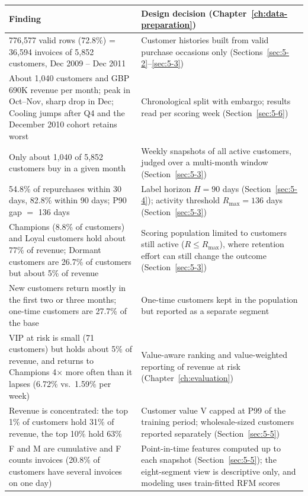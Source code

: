 \begin{center}
\small
\begin{tabular}{@{}p{7.2cm}p{7cm}@{}}
    \toprule
    Finding & Design decision (Chapter~\ref{ch:data-preparation}) \\
    \midrule
    776,577 valid rows (72.8\%) = 36,594 invoices of 5,852 customers, Dec 2009 -- Dec 2011 & Customer histories built from valid purchase occasions only (Sections~\ref{sec:5-2}--\ref{sec:5-3}) \\
    About 1,040 customers and GBP 690K revenue per month; peak in Oct--Nov, sharp drop in Dec; Cooling jumps after Q4 and the December 2010 cohort retains worst & Chronological split with embargo; results read per scoring week (Section~\ref{sec:5-6}) \\
    Only about 1,040 of 5,852 customers buy in a given month & Weekly snapshots of all active customers, judged over a multi-month window (Section~\ref{sec:5-3}) \\
    54.8\% of repurchases within 30 days, 82.8\% within 90 days; P90 gap $=$ 136 days & Label horizon $H = 90$ days (Section~\ref{sec:5-4}); activity threshold $R_{\max} = 136$ days (Section~\ref{sec:5-3}) \\
    Champions (8.8\% of customers) and Loyal customers hold about 77\% of revenue; Dormant customers are 26.7\% of customers but about 5\% of revenue & Scoring population limited to customers still active ($R \le R_{\max}$), where retention effort can still change the outcome (Section~\ref{sec:5-3}) \\
    New customers return mostly in the first two or three months; one-time customers are 27.7\% of the base & One-time customers kept in the population but reported as a separate segment \\
    VIP at risk is small (71 customers) but holds about 5\% of revenue, and returns to Champions 4$\times$ more often than it lapses (6.72\% vs.\ 1.59\% per week) & Value-aware ranking and value-weighted reporting of revenue at risk (Chapter~\ref{ch:evaluation}) \\
    Revenue is concentrated: the top 1\% of customers hold 31\% of revenue, the top 10\% hold 63\% & Customer value V capped at P99 of the training period; wholesale-sized customers reported separately (Section~\ref{sec:5-5}) \\
    F and M are cumulative and F counts invoices (20.8\% of customers have several invoices on one day) & Point-in-time features computed up to each snapshot (Section~\ref{sec:5-5}); the eight-segment view is descriptive only, and modeling uses train-fitted RFM scores \\
    \bottomrule
\end{tabular}
\end{center}
